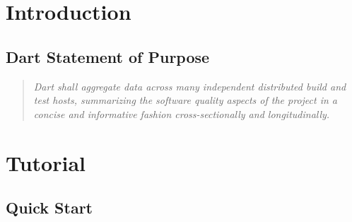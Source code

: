 \documentclass{InsightBook}
\begin{document}
\chapter{Introduction}

\section{Dart Statement of Purpose}
\begin{quote}
\emph{Dart shall aggregate data across many independent distributed
build and test hosts, summarizing the software quality aspects of the project
in a concise and informative fashion cross-sectionally and longitudinally.}
\end{quote}

\chapter{Tutorial}

\section{Quick Start}
\label{Section:QuickStart}
\end{document}
